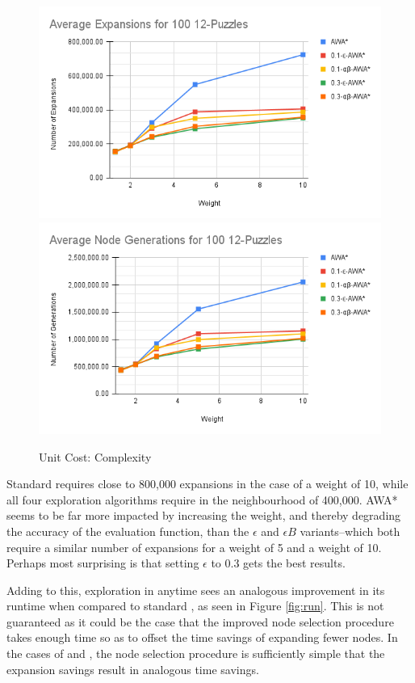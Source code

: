 \begin{figure}
    \includegraphics[width=\linewidth]{media/Average Expansions for 100 12-Puzzles.png}
    \includegraphics[width=\linewidth]{media/Average Node Generations for 100 12-Puzzles.png}
    \caption{Unit Cost: Complexity} \label{fig:nodes}
\end{figure}

Standard \awa requires close to 800,000 expansions in the case of a weight of 10, while all four exploration algorithms require in the neighbourhood of 400,000. AWA* seems to be far more impacted by increasing the weight, and thereby degrading the accuracy of the evaluation function, than the $\epsilon$ and $\epsilon B$ variants--which both require a similar number of expansions for a weight of 5 and a weight of 10. Perhaps most surprising is that setting $\epsilon$ to 0.3 gets the best results.

Adding to this, exploration in anytime sees an analogous improvement in its runtime when compared to standard \awa, as seen in Figure \ref{fig:run}. This is not guaranteed as it could be the case that the improved node selection procedure takes enough time so as to offset the time savings of expanding fewer nodes. In the cases of \eawa and \ebawa, the node selection procedure is sufficiently simple that the expansion savings result in analogous time savings. 

